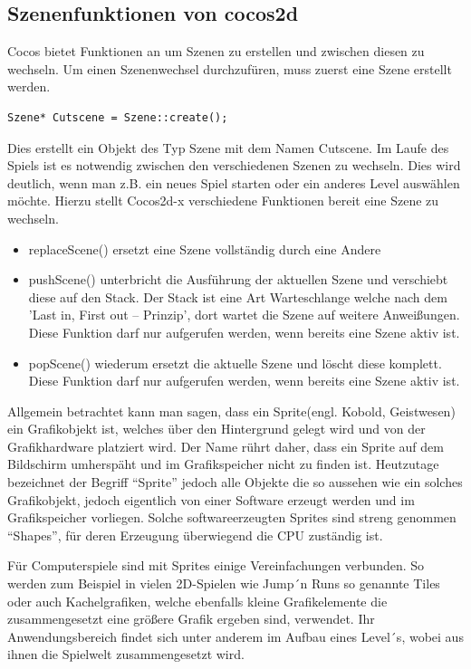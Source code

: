 \subsection{Szenenfunktionen von cocos2d}

Cocos bietet Funktionen an um Szenen zu erstellen und zwischen diesen zu wechseln. Um einen Szenenwechsel durchzufüren, muss zuerst eine Szene erstellt werden.

\begin{lstlisting}[style=singleline]
	Szene* Cutscene = Szene::create();
\end{lstlisting}


Dies erstellt ein Objekt des Typ Szene mit dem Namen Cutscene.
Im Laufe des Spiels ist es  notwendig zwischen den verschiedenen Szenen zu wechseln. Dies wird deutlich, wenn man z.B. ein neues Spiel starten oder ein anderes Level auswählen möchte. Hierzu stellt Cocos2d-x verschiedene Funktionen bereit eine Szene zu wechseln.

\begin{itemize}
\item replaceScene() ersetzt eine Szene vollständig durch eine Andere
\item pushScene() unterbricht die Ausführung der aktuellen Szene und verschiebt diese auf den Stack. Der Stack ist eine Art Warteschlange welche nach dem 'Last in, First out – Prinzip', dort wartet die Szene auf weitere Anweißungen. Diese Funktion darf nur aufgerufen werden, wenn bereits eine Szene aktiv ist.
\item popScene() wiederum ersetzt die aktuelle Szene und löscht diese komplett. Diese Funktion darf nur aufgerufen werden, wenn bereits eine Szene aktiv ist.
\end{itemize}



\label{sec:2_Spriteprinzip}
Allgemein betrachtet kann man sagen, dass ein Sprite(engl. Kobold, Geistwesen) ein Grafikobjekt ist, welches über den Hintergrund gelegt wird und von der Grafikhardware platziert wird. 
Der Name rührt daher, dass ein Sprite auf dem Bildschirm umherspäht und im Grafikspeicher nicht zu finden ist. Heutzutage bezeichnet der Begriff “Sprite” jedoch alle Objekte die so aussehen wie ein solches Grafikobjekt, jedoch eigentlich von einer Software erzeugt werden und im Grafikspeicher vorliegen. 
Solche softwareerzeugten Sprites sind streng genommen “Shapes”, für deren Erzeugung überwiegend die CPU zuständig ist.
 
Für Computerspiele sind mit Sprites einige Vereinfachungen verbunden. So werden zum Beispiel in vielen 2D-Spielen wie Jump´n Runs so genannte Tiles oder auch Kachelgrafiken, welche ebenfalls kleine Grafikelemente die zusammengesetzt eine größere Grafik ergeben sind, verwendet. Ihr Anwendungsbereich findet sich unter anderem im Aufbau eines Level´s, wobei aus ihnen die Spielwelt zusammengesetzt wird.

